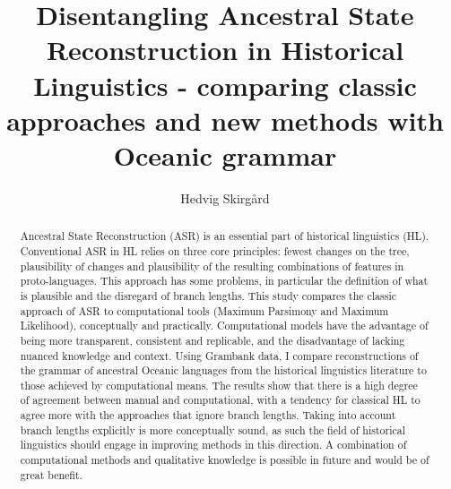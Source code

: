 \documentclass[12pt,letterpaper]{article}
\title{Disentangling Ancestral State Reconstruction in Historical Linguistics - comparing classic approaches and new methods with Oceanic grammar}
\author{Hedvig Skirgård}
\begin{document}

\thispagestyle{empty}


\maketitle
\thispagestyle{empty}





\begin{abstract}

Ancestral State Reconstruction (ASR) is an essential part of historical linguistics (HL). Conventional ASR in HL relies on three core principles: fewest changes on the tree,  plausibility of changes and plausibility of the resulting combinations of features in proto-languages. This approach has some problems, in particular the definition of what is plausible and the disregard of branch lengths. This study compares the classic approach of ASR to computational tools (Maximum Parsimony and Maximum Likelihood), conceptually and practically. Computational models have the advantage of being more transparent, consistent and replicable, and the disadvantage of lacking nuanced knowledge and context. Using Grambank data, I compare reconstructions of the grammar of ancestral Oceanic languages from the historical linguistics literature to those achieved by computational means. The results show that there is a high degree of agreement between manual and computational, with a tendency for classical HL to agree more with the approaches that ignore branch lengths. Taking into account branch lengths explicitly is more conceptually sound, as such the field of historical linguistics should engage in improving methods in this direction. A combination of computational methods and qualitative knowledge is possible in future and would be of great benefit.


\end{abstract}
\end{document}
